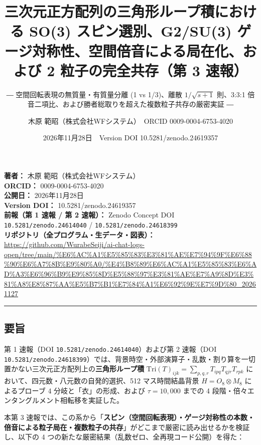 \documentclass[
  a4paper,
]{ltjsarticle}
\title{三次元正方配列の三角形ループ積における SO(3) スピン選別、G2/SU(3)
ゲージ対称性、空間倍音による局在化、および 2 粒子の完全共存（第 3
速報）}
\subtitle{― 空間回転表現の無質量・有質量分離 (1 vs 1/3)、離散
\(1/\sqrt{s+1}\) 則、3:3:1
倍音二項比、および勝者総取りを超えた複数粒子共存の厳密実証 ―}
\author{木原 範昭（株式会社WFシステム）　ORCID 0009-0004-6753-4020}
\date{2026年11月28日　Version DOI 10.5281/zenodo.24619357}
\begin{document}
\maketitle

\textbf{著者：} 木原 範昭（株式会社WFシステム）\\
\textbf{ORCID：} 0009-0004-6753-4020\\
\textbf{公開日：} 2026年11月28日\\
\textbf{Version DOI：} 10.5281/zenodo.24619357\\
\textbf{前報（第 1 速報 / 第 2 速報）：} Zenodo Concept DOI
\texttt{10.5281/\allowbreak{}zenodo.24614040} / \texttt{10.5281/\allowbreak{}zenodo.24618399}\\
\textbf{リポジトリ（全プログラム・生データ・図表）：}
\url{https://github.com/WurabeSeiji/ai-chat-logs-open/tree/main/\%E6\%AC\%A1\%E5\%85\%83\%E3\%81\%AE\%E7\%94\%9F\%E6\%88\%90\%E6\%A7\%8B\%E9\%80\%A0/\%E4\%B8\%89\%E6\%AC\%A1\%E5\%85\%83\%E6\%AD\%A3\%E6\%96\%B9\%E9\%85\%8D\%E5\%88\%97\%E3\%81\%AE\%E7\%A9\%8D\%E3\%81\%A8\%E8\%87\%AA\%E5\%B7\%B1\%E7\%84\%A1\%E6\%92\%9E\%E7\%9D\%80\_20261127}

\begin{center}\rule{0.5\linewidth}{0.5pt}\end{center}

\subsection{要旨}\label{ux8981ux65e8}

第 1 速報（DOI \texttt{10.5281/\allowbreak{}zenodo.24614040}）および第 2 速報（DOI
\texttt{10.5281/\allowbreak{}zenodo.24618399}）では、背景時空・外部演算子・乱数・割り算を一切置かない三次元正方配列上の\textbf{三角形ループ積}
\(\mathrm{Tri}(T)_{ijk} = \sum_{p,q,r} T_{ipq} T_{qjr} T_{rpk}\)
において、四元数・八元数の自発的選択、512 マス時間結晶背景
\(H = O_8 \otimes M_8\) によるプローブ 4 分岐と「衣」の形成、および
\(\tau = 10,000\) までの 4
段階・倍々エンタングルメント相転移を実証した。

本第 3
速報では、この系から「\textbf{スピン（空間回転表現）・ゲージ対称性の本数・倍音による粒子局在・複数粒子の共存}」がどこまで厳密に読み出せるかを検証し、以下の
4 つの新たな厳密結果（乱数ゼロ、全再現コード公開）を得た：
\end{document}
